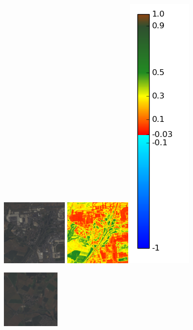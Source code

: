\documentclass{book}
\begin{document}
\begin{figure}[H]
\centerline{
\includegraphics[scale=1.1]{images/Roissy-en-France/07_rgb.png}
\includegraphics[scale=1.1]{images/Roissy-en-France/07_ndvi.png}
\includegraphics[scale=0.3]{images/colormap.png}
}
\centerline{
\includegraphics[scale=1.1]{images/Fontenay-en-Parisis/07_rgb.png}
}
\end{figure}
\end{document}
